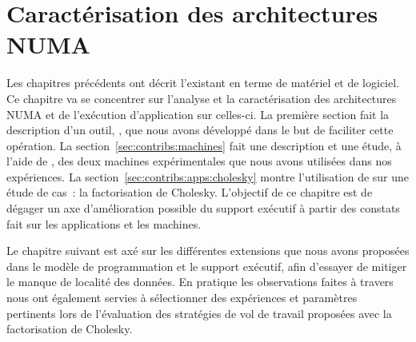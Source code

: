 

\chapter{Caractérisation des architectures NUMA}\label{chap:contrib:characterization}
\chaptertoc

Les chapitres précédents ont décrit l'existant en terme de matériel et de logiciel.
Ce chapitre va se concentrer sur l'analyse et la caractérisation des architectures NUMA et de l'exécution d'application sur celles-ci.
La première section fait la description d'un outil, \outil, que nous avons développé dans le but de faciliter cette opération.
La section~\ref{sec:contribs:machines} fait une description et une étude, à l'aide de \outil, des deux machines expérimentales que nous avons utilisées dans nos expériences.
La section~\ref{sec:contribs:apps:cholesky} montre l'utilisation de \outil sur une étude de cas~: la factorisation de Cholesky.
L'objectif de ce chapitre est de dégager un axe d'amélioration possible du support exécutif à partir des constats fait sur les applications et les machines.






\bigskip
\bigskip

Le chapitre suivant est axé sur les différentes extensions que nous avons proposées dans le modèle de programmation et le support exécutif, afin d'essayer de mitiger le manque de localité des données.
En pratique les observations faites à travers \outil nous ont également servies à sélectionner des expériences et paramètres pertinents lors de l'évaluation des stratégies de vol de travail proposées avec la factorisation de Cholesky.
